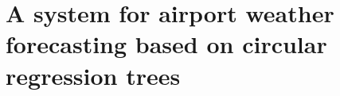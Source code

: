
\chapter{A system for airport weather forecasting based on circular regression trees}

\label{AppendixB} %